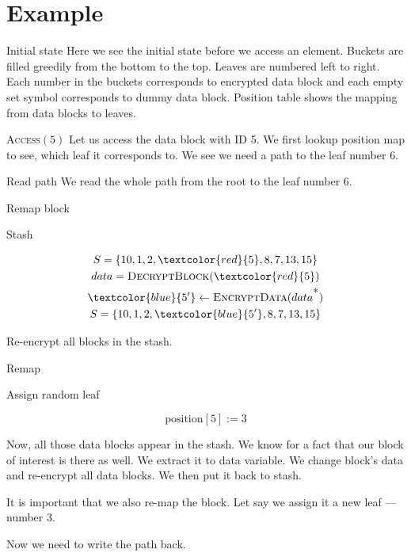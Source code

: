 


\section{Example}

	\exampleFrame%
		{Initial state}
		{}
		{}
		{}
		{
			Here we see the initial state before we access an element.
			Buckets are filled greedily from the bottom to the top.
			Leaves are numbered left to right.
			Each number in the buckets corresponds to encrypted data block and each empty set symbol corresponds to dummy data block.
			Position table shows the mapping from data blocks to leaves.
		}

	\exampleFrame%
		{\textsc{Access}$(5)$}
		{\selectedtrue}
		{}
		{}
		{
			Let us access the data block with ID 5.
			We first lookup position map to see, which leaf it corresponds to.
			We see we need a path to the leaf number 6.
		}
	
	\exampleFrame%
		{Read path}
		{
			\selectedtrue%
			\pathreadtrue%
		}
		{}
		{}
		{
			We read the whole path from the root to the leaf number 6.
		}

	\exampleFrame%
		{Remap block}
		{}
		{
			\begin{block}{Stash}
				
				\begin{gather*}
					S = \{ 10, 1, 2, \textcolor{red}{5}, 8, 7, 13, 15 \} \\
					data = \textsc{DecryptBlock}(\textcolor{red}{5}) \\
					\textcolor{blue}{5^\prime} \gets \textsc{EncryptData}(data^{\mbox{*}}) \\
					S = \{ 10, 1, 2, \textcolor{blue}{5^\prime}, 8, 7, 13, 15 \}
				\end{gather*}

				Re-encrypt all blocks in the stash.
	
			\end{block}
		}
		{
			\vspace{10pt}
			\begin{block}{Remap}
				
				Assign random leaf
	
				\[
					\text{position}[5] := 3
				\]
	
			\end{block}
		}
		{
			Now, all those data blocks appear in the stash.
			We know for a fact that our block of interest is there as well.
			We extract it to data variable.
			We change block's data and re-encrypt all data blocks.
			We then put it back to stash.

			It is important that we also re-map the block.
			Let say we assign it a new leaf --- number 3.

			Now we need to write the path back.
		}

